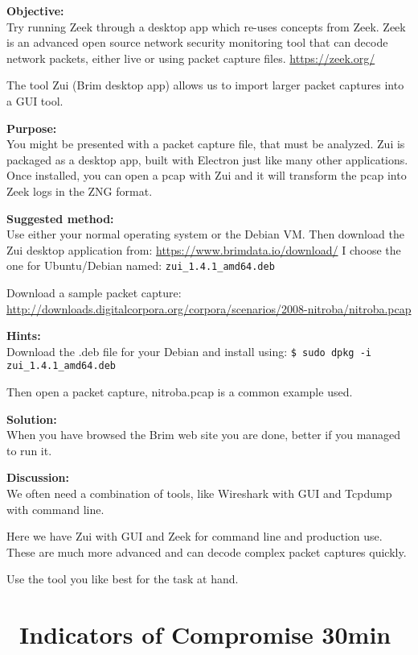 \documentclass[a4paper,11pt,notitlepage]{report}
\begin{document}

{\bf Objective:}\\
Try running Zeek through a desktop app which re-uses concepts from Zeek. Zeek is an advanced open source network security monitoring tool that can decode network packets, either live or using packet capture files. \url{https://zeek.org/}

The tool Zui (Brim desktop app) allows us to import larger packet captures into a GUI tool.

{\bf Purpose:}\\
You might be presented with a packet capture file, that must be analyzed. Zui is packaged as a desktop app, built with Electron just like many other applications. Once installed, you can open a pcap with Zui and it will transform the pcap into Zeek logs in the ZNG format.

{\bf Suggested method:}\\
Use either your normal operating system or the Debian VM. Then download the Zui desktop application from:
\url{https://www.brimdata.io/download/} I choose the one for Ubuntu/Debian named: \verb+zui_1.4.1_amd64.deb+

Download a sample packet capture:\\
\url{http://downloads.digitalcorpora.org/corpora/scenarios/2008-nitroba/nitroba.pcap}


{\bf Hints:}\\
Download the .deb file for your Debian and install using:
\verb+$ sudo dpkg -i zui_1.4.1_amd64.deb+

Then open a packet capture, nitroba.pcap is a common example used.

{\bf Solution:}\\
When you have browsed the Brim web site you are done, better if you managed to run it.

{\bf Discussion:}\\
We often need a combination of tools, like Wireshark with GUI and Tcpdump with command line.

Here we have Zui with GUI and Zeek for command line and production use. These are much more advanced and can decode complex packet captures quickly.

Use the tool you like best for the task at hand.




\chapter{\faExclamationTriangle\ Indicators of Compromise 30min}
\label{ex:zeekioc}
\end{document}
